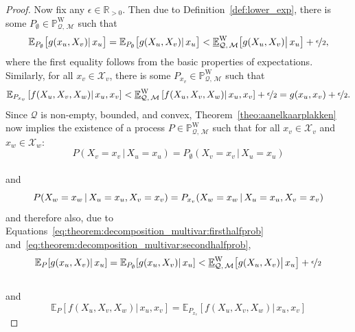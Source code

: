 \documentclass[10pt,a4paper]{paper}
\theoremstyle{definition}
\newcommand{\reals}{\mathbb{R}}
\newcommand{\realspos}{\reals_{>0}}
\newcommand{\states}{\mathcal{X}}
\newcommand{\processes}{\mathbb{P}}
\newcommand{\wprocesses}{\processes^{\mathrm{W}}}
\newcommand{\rateset}{\mathcal{Q}}
\begin{document}
\begin{proof}
\noindent
Now fix any $\epsilon\in\realspos$.
Then due to Definition~\ref{def:lower_exp}, there is some $P_\emptyset\in\wprocesses_{\rateset,\,\mathcal{M}}$ such that
\begin{equation}\label{eq:theorem:decomposition_multivar:firsthalfprob}
\mathbb{E}_{P_\emptyset}\bigl[g(x_u,X_v)\vert\,x_u\bigr]
=\mathbb{E}_{P_\emptyset}\bigl[g(X_u,X_v)\vert\,x_u\bigr] < \underline{\mathbb{E}}^{\mathrm{W}}_{\rateset,\,\mathcal{M}}\bigl[g(X_u,X_v)\big\vert\,x_u\bigr]
+\nicefrac{\epsilon}{2},
\end{equation}
where the first equality follows from the basic properties of expectations. Similarly, for all $x_{v}\in\states_v$, there is some $P_{x_v}\in\wprocesses_{\rateset,\,\mathcal{M}}$ such that
\begin{equation}\label{eq:theorem:decomposition_multivar:secondhalfprob}
\mathbb{E}_{P_{x_v}}\left[f(X_u,X_v,X_w)\vert\,x_u,x_v\right] < \underline{\mathbb{E}}^{\mathrm{W}}_{\rateset,\,\mathcal{M}}\left[f(X_u,X_v,X_w)\vert\,x_u,x_v\right]+\nicefrac{\epsilon}{2}=g(x_u,x_v)+\nicefrac{\epsilon}{2}.
\end{equation}
Since $\rateset$ is non-empty, bounded, and convex, Theorem~\ref{theo:aanelkaarplakken} now implies the existence of a process $P\in\wprocesses_{\rateset,\,\mathcal{M}}$ such that for all $x_v\in\states_v$ and $x_w\in\states_w$:
\begin{equation*}
P(X_v=x_v\,\vert\,X_u=x_u) = P_\emptyset(X_v=x_v\,\vert\,X_u=x_u)
\end{equation*}\\[-20pt]
and
\begin{equation*}
P(X_w=x_w\,\vert\,X_u=x_u,X_v=x_v) = P_{x_v}(X_w=x_w\,\vert\,X_u=x_u,X_v=x_v)\vspace{6pt}
\end{equation*}
and therefore also, due to Equations~\eqref{eq:theorem:decomposition_multivar:firsthalfprob} and~\eqref{eq:theorem:decomposition_multivar:secondhalfprob},
\begin{equation*}%
\mathbb{E}_P[g(x_u,X_v)\vert\,x_u]
=\mathbb{E}_{P_\emptyset}[g(x_u,X_v)\vert\,x_u]
< \underline{\mathbb{E}}^{\mathrm{W}}_{\rateset,\,\mathcal{M}}\bigl[g(X_u,X_v)\big\vert\,x_u\bigr]
+\nicefrac{\epsilon}{2}
\end{equation*}\\[-20pt]
and
\begin{equation*}%
\mathbb{E}_P[f(X_u,X_v,X_w)\vert\,x_u,x_v]
=\mathbb{E}_{P_{x_v}}[f(X_u,X_v,X_w)\vert\, x_u,x_v]

\end{equation*}
\end{proof}
\end{document}
